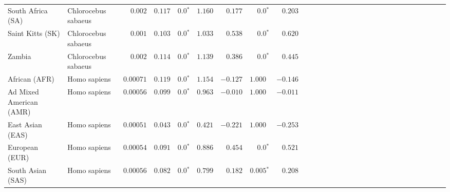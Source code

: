 \begin{center}
\begin{adjustbox}{width = 1\textwidth}
\begin{tabular}{|l|l|r|r|r|r|r|r|r|r|r|r|r|r|r|r|r|r|r|r|r|r|r|r|r|r|r|r|r|}
              South Africa (SA) &  Chlorocebus sabaeus &           $ 0.002$ &                      $ 0.117$ &                  $\bm{0.0{^*}}$ &                                           $ 1.160$ &                      $ 0.177$ &                  $\bm{0.0{^*}}$ &                                           $ 0.203$ \\
               Saint Kitts (SK) &  Chlorocebus sabaeus &           $ 0.001$ &                      $ 0.103$ &                  $\bm{0.0{^*}}$ &                                           $ 1.033$ &                      $ 0.538$ &                  $\bm{0.0{^*}}$ &                                           $ 0.620$ \\
                         Zambia &  Chlorocebus sabaeus &           $ 0.002$ &                      $ 0.114$ &                  $\bm{0.0{^*}}$ &                                           $ 1.139$ &                      $ 0.386$ &                  $\bm{0.0{^*}}$ &                                           $ 0.445$ \\
                  African (AFR) &         Homo sapiens &          $0.00071$ &                      $ 0.119$ &                  $\bm{0.0{^*}}$ &                                           $ 1.154$ &                      $-0.127$ &                      $ 1.000~~$ &                                           $-0.146$ \\
        Ad Mixed American (AMR) &         Homo sapiens &          $0.00056$ &                      $ 0.099$ &                  $\bm{0.0{^*}}$ &                                           $ 0.963$ &                      $-0.010$ &                      $ 1.000~~$ &                                           $-0.011$ \\
               East Asian (EAS) &         Homo sapiens &          $0.00051$ &                      $ 0.043$ &                  $\bm{0.0{^*}}$ &                                           $ 0.421$ &                      $-0.221$ &                      $ 1.000~~$ &                                           $-0.253$ \\
                 European (EUR) &         Homo sapiens &          $0.00054$ &                      $ 0.091$ &                  $\bm{0.0{^*}}$ &                                           $ 0.886$ &                      $ 0.454$ &                  $\bm{0.0{^*}}$ &                                           $ 0.521$ \\
              South Asian (SAS) &         Homo sapiens &          $0.00056$ &                      $ 0.082$ &                  $\bm{0.0{^*}}$ &                                           $ 0.799$ &                      $ 0.182$ &               $\bm{ 0.005{^*}}$ &                                           $ 0.208$ \\
\bottomrule
\end{tabular}
\end{adjustbox}
\end{center}
\newpage
